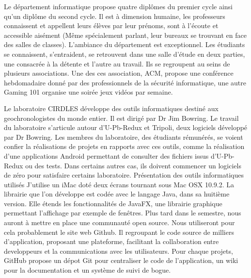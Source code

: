 Le département informatique propose quatre diplômes du premier cycle ainsi qu’un diplôme du second cycle. Il est à dimension humaine, les professeurs connaissent et appellent leurs élèves par leur prénoms, sont à l’écoute et accessible aisément (Même spécialement parlant, leur bureaux se trouvant en face des salles de classes).
L’ambiance du département est exceptionnel. Les étudiants se connaissent, s’entraident, se retrouvent dans une salle d’étude en deux parties, une consacrée à la détente et l’autre au travail. Ils se regroupent au seins de plusieurs associations. Une des ces association, ACM, propose une conférence hebdomadaire donné par des professionnels de la sécurité informatique, une autre Gaming 101 organise une soirée jeux vidéos par semaine.

Le laboratoire CIRDLES développe des outils informatiques destiné aux geochronologistes du monde entier. Il est dirigé par Dr Jim Bowring. Le travail du laboratoire s’articule autour d’U-Pb-Redux et Tripoli, deux logiciels développé par Dr Bowring. Les membres du laboratoire, des étudiants rémunérés, se voient confier la réalisations de projets en rapports avec ces outils, comme la réalisation d’une applications Android permettant de consulter des fichiers issus d’U-Pb-Redux ou des tests. Dans certains autres cas, ils doivent commencer un logiciels de zéro pour satisfaire certains laboratoire.
Présentation des outils informatiques utilisés
J’utilise un iMac doté deux écrans tournant sous Mac OSX 10.9.2. La librairie que l’on développe est codée avec le langage Java, dans sa huitième version. Elle étends les fonctionnalités de JavaFX, une librairie graphique permettant l’affichage par exemple de fenêtres.
Plus tard dans le semestre, nous auront à mettre en place une communauté open source. Nous utiliseront pour cela probablement le site web Github. Il regroupant le code source de milliers d’application, proposant une plateforme, facilitant la collaboration entre developpeurs et la communications avec les utilisateurs. Pour chaque projets, GitHub propose un dépot Git pour centraliser le code de l’application, un wiki pour la documentation et un système de suivi de bogue.
